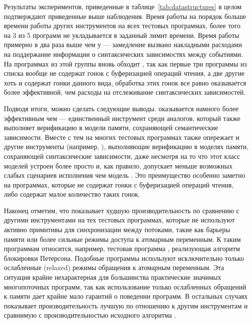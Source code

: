 

Результаты экспериментов, приведенные в таблице~\ref{tab:datastructures}
в целом подтверждают приведенные выше наблюдения. 
Время работы \CDSChecker на порядок больше времени 
работы других инструментов на всех тестовых программах, 
более того на 3 из 5 программ \CDSChecker не укладывается 
в заданный лимит времени. Время работы \hmc примерно в
два раза выше чем у \genmc --- замедление вызвано накладными расходами
на поддержание информации о синтаксических зависимостях между событиями.
На программах из этой группы \wmc вновь обходит \hmc, 
так как первые три программы из списка вообще не содержат 
гонок с буферизацией операций чтения, 
а две другие хоть и содержат гонки данного вида, 
обработка этих гонок все равно оказывается 
более эффективной, чем расходы на отслеживание синтаксических зависимостей.

Подводя итоги, можно сделать следующие выводы. 
\wmc оказывается намного более эффективным чем \CDSChecker --- 
единственный инструмент среди аналогов, который 
также выполняет верификацию в модели памяти, сохраняющей семантические зависимости.    
Вместе с тем на многих тестовых программах \wmc также опережает 
и другие инструменты (например, \hmc),
выполняющие верификацию в моделях памяти, 
сохраняющей синтаксические зависимости, даже 
несмотря на то что этот класс моделей устроен более просто
и, как правило, допускает меньше возможных 
слабых сценариев исполнения чем модель \WkmS.
Это преимущество особенно заметно на программах, 
которые не содержат гонки с буферизацией операций чтения, 
либо содержат малое количество таких гонок. 

Наконец отметим, что \wmc показывает худшую производительность 
по сравнению с другими инструментами на тех тестовых программах, 
которые не используют активно примитивы для синхронизации между потоками, 
такие как барьеры памяти или более сильные режимы доступа к атомарным переменным. 
К таким программам относится, например, тестовая программа , 
реализующая алгоритм блокировки Петерсона. 
Подобные программы используют исключительно только ослабленные (relaxed)
режимы обращения к атомарным переменным.
Эта ситуация крайне нехарактерная для большинства 
практические значимых многопоточных программ, 
так как использование только ослабленных обращений к памяти
дает крайне мало гарантий о поведении программ. 
В остальных случаях \wmc показывает производительность 
лучшую по отношению к другим инструментам
и сравнимую с производительностью исходного алгоритма \genmc.

